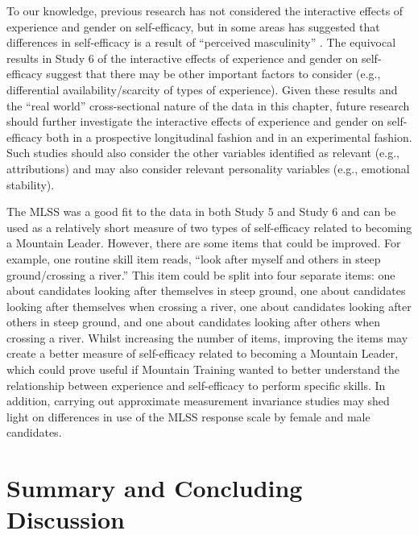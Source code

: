 \documentclass[
  12pt,
  a4paper,
]{book}
\begin{document}
To our knowledge, previous research has not considered the interactive effects of experience and gender on self-efficacy, but in some areas has suggested that differences in self-efficacy is a result of ``perceived masculinity'' \citep[p 135]{Cassidy2002}. The equivocal results in Study 6 of the interactive effects of experience and gender on self-efficacy suggest that there may be other important factors to consider (e.g., differential availability/scarcity of types of experience). Given these results and the ``real world'' cross-sectional nature of the data in this chapter, future research should further investigate the interactive effects of experience and gender on self-efficacy both in a prospective longitudinal fashion and in an experimental fashion. Such studies should also consider the other variables identified as relevant (e.g., attributions) and may also consider relevant personality variables (e.g., emotional stability).

The MLSS was a good fit to the data in both Study 5 and Study 6 and can be used as a relatively short measure of two types of self-efficacy related to becoming a Mountain Leader. However, there are some items that could be improved. For example, one routine skill item reads, ``look after myself and others in steep ground/crossing a river.'' This item could be split into four separate items: one about candidates looking after themselves in steep ground, one about candidates looking after themselves when crossing a river, one about candidates looking after others in steep ground, and one about candidates looking after others when crossing a river. Whilst increasing the number of items, improving the items may create a better measure of self-efficacy related to becoming a Mountain Leader, which could prove useful if Mountain Training wanted to better understand the relationship between experience and self-efficacy to perform specific skills. In addition, carrying out approximate measurement invariance studies may shed light on differences in use of the MLSS response scale by female and male candidates.

\hypertarget{chapter-4-general-discussion}{%
\section{Summary and Concluding Discussion}\label{chapter-4-general-discussion}}
\end{document}
